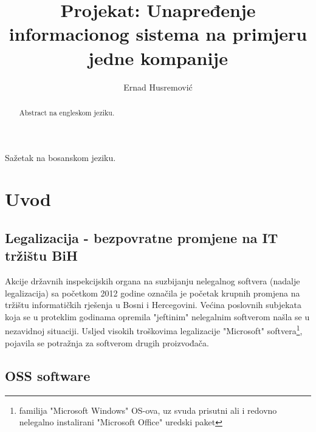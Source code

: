 \documentclass[times, utf8, seminar]{fit}
\begin{document}
\title{Projekat: Unapređenje informacionog sistema na primjeru jedne kompanije}

\author{Ernad Husremović}


\maketitle

\tableofcontents

\listoftables
\listoffigures

\begin{sazetak}


Sažetak na bosanskom jeziku.

\end{sazetak}

\begin{abstract}
Abstract na engleskom jeziku.

\end{abstract}


\chapter{Uvod}

\section{Legalizacija - bezpovratne promjene na IT tržištu BiH}

Akcije državnih inspekcijskih organa na suzbijanju nelegalnog softvera (nadalje legalizacija) sa početkom 2012 godine označila je početak krupnih promjena na tržištu informatičkih  rješenja u Bosni i Hercegovini. 
Većina poslovnih subjekata koja se u proteklim godinama opremila "jeftinim" nelegalnim softverom  našla se u nezavidnoj situaciji.
Usljed visokih troškovima legalizacije "Microsoft" softvera\footnote{familija "Microsoft Windows" OS-ova, uz svuda prisutni ali i redovno nelegalno instalirani "Microsoft Office" uredski paket}, pojavila se potražnja za softverom drugih proizvođača.  

\section{OSS software}
\end{document}

